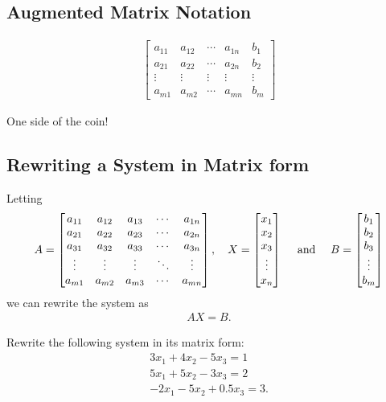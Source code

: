 \documentclass[12pt,a4paper]{article}
\newcounter{example}[section]
\begin{document}
\subsection{Augmented Matrix Notation}
	
	\begin{align*}
	\begin{bmatrix}
	a_{11} & a_{12} & \cdots & a_{1n} & b_1 \\
	a_{21} & a_{22} & \cdots & a_{2n} & b_2 \\
	\vdots & \vdots & \vdots & \vdots & \vdots \\
	a_{m1} & a_{m2} & \cdots & a_{mn} & b_m
	\end{bmatrix}
	\end{align*}
	
One side of the coin!

\subsection{Rewriting a System in Matrix form}
Letting
	\begin{align*}
	A = \matMN{a} , \quad X = \begin{bmatrix}
	x_1 \\ x_2 \\ x_3 \\ \vdots \\ x_n
	\end{bmatrix}
	\quad \text{ and } \quad B = \begin{bmatrix}
	b_1 \\ b_2 \\ b_3 \\ \vdots \\ b_m 
	\end{bmatrix}
	\end{align*}
we can rewrite the system as	
	\begin{align*}
	AX = B	.
	\end{align*}
	
\begin{example}
Rewrite the following system in its matrix form:
	\begin{align*}
	3x_1 + 4x_2 - 5x_3 = 1 \\
	5x_1 + 5x_2 - 3x_3 = 2 \\
	-2 x_1 - 5x_2 + 0.5 x_3 = 3 .
	\end{align*}
\end{example}
\end{document}
